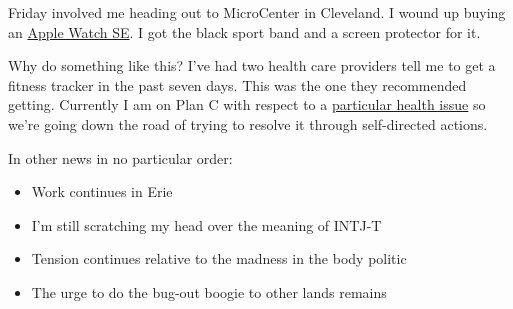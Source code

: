 Friday involved me heading out to MicroCenter in Cleveland. I wound up
buying an
\href{http://web.archive.org/web/20221029043435/https://www.apple.com/apple-watch-se/}{Apple
Watch SE}. I got the black sport band and a screen protector for it.

Why do something like this? I've had two health care providers tell me
to get a fitness tracker in the past seven days. This was the one they
recommended getting. Currently I am on Plan C with respect to a
\href{https://www.cdc.gov/healthyweight/losing_weight/getting_started.html}{particular
health issue} so we're going down the road of trying to resolve it
through self-directed actions.

In other news in no particular order:

\begin{itemize}
\tightlist
\item
  Work continues in Erie
\item
  I'm still scratching my head over the meaning of INTJ-T
\item
  Tension continues relative to the madness in the body politic
\item
  The urge to do the bug-out boogie to other lands remains
\end{itemize}
